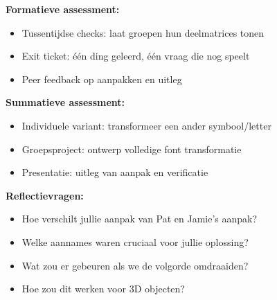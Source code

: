 \documentclass{ximera}
\begin{document}
\textbf{Formatieve assessment:}
\begin{itemize}
\item Tussentijdse checks: laat groepen hun deelmatrices tonen
\item Exit ticket: één ding geleerd, één vraag die nog speelt
\item Peer feedback op aanpakken en uitleg
\end{itemize}

\textbf{Summatieve assessment:}
\begin{itemize}
\item Individuele variant: transformeer een ander symbool/letter
\item Groepsproject: ontwerp volledige font transformatie
\item Presentatie: uitleg van aanpak en verificatie
\end{itemize}

\textbf{Reflectievragen:}
\begin{itemize}
\item Hoe verschilt jullie aanpak van Pat en Jamie's aanpak?
\item Welke aannames waren cruciaal voor jullie oplossing?
\item Wat zou er gebeuren als we de volgorde omdraaiden?
\item Hoe zou dit werken voor 3D objecten?
\end{itemize}
\end{document}
